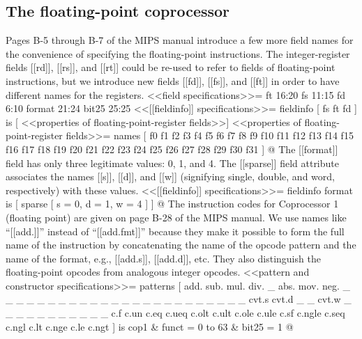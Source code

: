 \subsection{The floating-point coprocessor}

Pages B-5 through B-7 of the MIPS manual introduce a few more field names for the
convenience of specifying the floating-point instructions.
The integer-register fields [[rd]], [[rs]], and [[rt]] could be re-used to refer
to fields of floating-point instructions, but we introduce new fields
[[fd]], [[fs]], and [[ft]] in order to have different names for the registers.
<<field specifications>>=
ft 16:20 fs 11:15 fd 6:10 format 21:24 bit25 25:25
<<[[fieldinfo]] specifications>>=
fieldinfo [ fs ft fd ] is [ <<properties of floating-point-register fields>>]
<<properties of floating-point-register fields>>=
names [ f0  f1  f2  f3  f4  f5  f6  f7  f8  f9  f10 f11 f12 f13 f14 f15
        f16 f17 f18 f19 f20 f21 f22 f23 f24 f25 f26 f27 f28 f29 f30 f31 ]
@
The [[format]] field has only three legitimate values: 0, 1, and 4.
The [[sparse]] field attribute associates the names 
[[s]], [[d]], and [[w]] (signifying single, double, and word,
respectively) with these values.
<<[[fieldinfo]] specifications>>=
fieldinfo format is [ sparse [ s = 0, d = 1, w = 4 ] ]
@ 
The instruction codes for Coprocessor 1 (floating point)
are given on page B-28 of the MIPS manual.
We use names like ``[[add.]]'' instead of ``[[add.fmt]]'' because 
they make it possible to form the full name of the instruction by
concatenating the name of the opcode pattern and the name of the format,
e.g., [[add.s]], [[add.d]], etc.
They also distinguish the floating-point opcodes from analogous
integer opcodes.
<<pattern and constructor specifications>>=
patterns
 [ add.    sub.    mul.    div.    _       abs.    mov.    neg.   
   _       _       _       _       _       _       _       _
   _       _       _       _       _       _       _       _
   _       _       _       _       _       _       _       _
   cvt.s   cvt.d   _       _       cvt.w   _       _       _
   _       _       _       _       _       _       _       _
   c.f     c.un    c.eq    c.ueq   c.olt   c.ult   c.ole   c.ule
   c.sf    c.ngle  c.seq   c.ngl   c.lt    c.nge   c.le    c.ngt ] 
 is cop1 & funct = {0 to 63} & bit25 = 1
@

